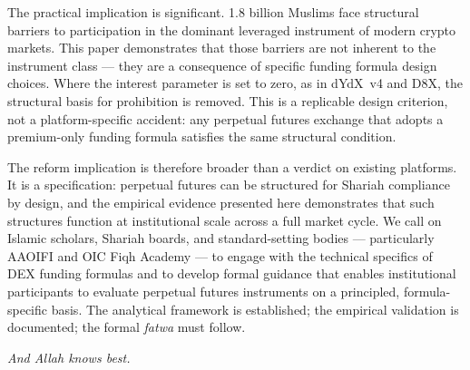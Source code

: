 \documentclass[10pt,twocolumn]{article}
\begin{document}
The practical implication is significant. 1.8 billion Muslims face structural
barriers to participation in the dominant leveraged instrument of modern crypto
markets. This paper demonstrates that those barriers are not inherent to the
instrument class --- they are a consequence of specific funding formula design
choices. Where the interest parameter is set to zero, as in dYdX~v4 and D8X,
the structural basis for prohibition is removed. This is a replicable design
criterion, not a platform-specific accident: any perpetual futures exchange that
adopts a premium-only funding formula satisfies the same structural condition.

The reform implication is therefore broader than a verdict on existing platforms.
It is a specification: perpetual futures can be structured for Shariah compliance
by design, and the empirical evidence presented here demonstrates that such
structures function at institutional scale across a full market cycle. We call on
Islamic scholars, Shariah boards, and standard-setting bodies --- particularly
AAOIFI and OIC Fiqh Academy --- to engage with the technical specifics of DEX
funding formulas and to develop formal guidance that enables institutional
participants to evaluate perpetual futures instruments on a principled,
formula-specific basis. The analytical framework is established; the empirical
validation is documented; the formal \textit{fatwa} must follow.

\textit{And Allah knows best.}
\end{document}
